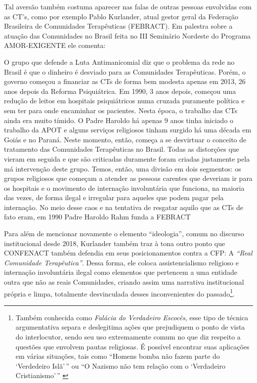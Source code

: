 \documentclass[
	12pt,				%
	oneside,			%
	a4paper,			%
	sumario=tradicional,
	english,			%
	brazil				%
	]{abntex2}
\begin{document}
Tal aversão também costuma aparecer nas falas de outras pessoas envolvidas com as CT's, como por exemplo Pablo Kurlander, atual gestor geral da Federação Brasileira de Comunidades Terapêuticas (FEBRACT). Em palestra sobre a atuação das Comunidades no Brasil feita no III Seminário Nordeste do Programa AMOR-EXIGENTE ele comenta:
\begin{quoting}[rightmargin=0cm,leftmargin=4cm]
\begin{singlespace}
{\footnotesize
O grupo que defende a Luta Antimanicomial diz que o problema da rede no Brasil é que o dinheiro é desviado para as Comunidades Terapêuticas. Porém, o governo começou a financiar as CTs de forma bem modesta apenas em 2013, 26 anos depois da Reforma Psiquiátrica. Em 1990, 3 anos depois, começou uma redução de leitos em hospitais psiquiátricos numa cruzada puramente política e sem ter para onde encaminhar os pacientes. Nesta época, o trabalho das CTs ainda era muito tímido. O Padre Haroldo há apenas 9 anos tinha iniciado o trabalho da APOT e alguns serviços religiosos tinham surgido há uma década em Goiás e no Paraná. Neste momento, então, começa a se desvirtuar o conceito de tratamento das Comunidades Terapêuticas no Brasil. Todas as distorções que vieram em seguida e que são criticadas duramente foram criadas justamente pela má intervenção deste grupo. Temos, então, uma divisão em dois segmentos: os grupos religiosos que começam a atender as pessoas carentes que deveriam ir para os hospitais e o movimento de internação involuntária que funciona, na maioria das vezes, de forma ilegal e irregular para aqueles que podem pagar pela internação. No meio desse caos e na tentativa de resgatar aquilo que as CTs de fato eram, em 1990 Padre Haroldo Rahm funda a FEBRACT \cite{febract2019}} 
\end{singlespace}
\end{quoting}
Para além de mencionar novamente o elemento ``ideologia'', comum no discurso institucional desde 2018, Kurlander também traz à tona outro ponto que CONFENACT também defendia em seus posicionamentos contra a \acrshort{CFP}: A \emph{``Real Comunidade Terapêutica''}. Dessa forma, ele coloca assistencialismo religioso e internação involuntária ilegal como elementos que pertencem a uma entidade outra que não as reais Comunidades, criando assim uma narrativa institucional própria e limpa, totalmente desvinculada desses inconvenientes do passado\footnote{Também conhecida como \emph{Falácia do Verdadeiro Escocês}, esse tipo de técnica argumentativa separa e deslegitima ações que prejudiquem o ponto de vista do interlocutor, sendo seu uso extremamente comum no que diz respeito a questões que envolvem pautas religiosas. É possível encontrar suas aplicações em várias situações, tais como ``Homens bomba não fazem parte do `Verdedeiro Islã'\,'' \autocite[171]{orsi_is_2003} ou ``O Nazismo não tem relação com o `Verdadeiro Cristianismo'\,'' \autocite[258]{avalos_fighting_2005}}.
\end{document}
